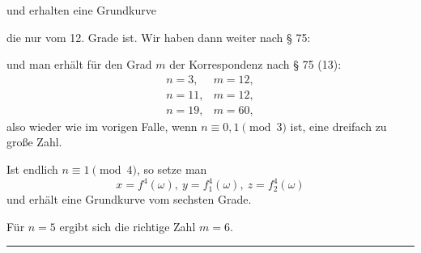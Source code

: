 und erhalten eine Grundkurve


die nur vom 12. Grade ist. Wir haben dann weiter nach § 75:


und man erhält für den Grad $m$ der Korrespondenz nach
§ 75 (13):
\[
\begin{array}{ll}
n=3, & m=12,\\
n=11, & m=12,\\
n=19, & m=60,
\end{array}
\]
also wieder wie im vorigen Falle, wenn $n\equiv 0, 1 \pmod 3$ ist,
eine dreifach zu große Zahl.

Ist endlich $n\equiv 1 \pmod 4$, so setze man
\[
x=f^4(\omega),\ y=f_1^4(\omega),\ z=f_2^4(\omega)
\]
und erhält eine Grundkurve vom sechsten Grade.

Für $n=5$ ergibt sich die richtige Zahl $m=6$.

\noindent\rule{0.3\textwidth}{0.4pt}
